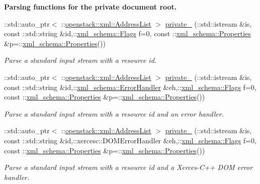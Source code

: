 \begin{Indent}{\bf Parsing functions for the private document root.}
\begin{DoxyCompactItemize}
::std::auto\_\-ptr$<$ ::\hyperlink{classopenstack_1_1xml_1_1AddressList}{openstack::xml::AddressList} $>$ \hyperlink{namespaceopenstack_1_1xml_a8ab362fa648bbf2ce1b9ac6b47ff9483}{private\_\-} (::std::istream \&is, const ::std::string \&id,::\hyperlink{namespacexml__schema_affb4c227cbd9aa7453dd1dc5a1401943}{xml\_\-schema::Flags} f=0, const ::\hyperlink{namespacexml__schema_ad27ce19a7ee1d3b1064092648898f64c}{xml\_\-schema::Properties} \&p=::\hyperlink{namespacexml__schema_ad27ce19a7ee1d3b1064092648898f64c}{xml\_\-schema::Properties}())
\begin{DoxyCompactList}\small\item\em Parse a standard input stream with a resource id. \item\end{DoxyCompactList}\item 
::std::auto\_\-ptr$<$ ::\hyperlink{classopenstack_1_1xml_1_1AddressList}{openstack::xml::AddressList} $>$ \hyperlink{namespaceopenstack_1_1xml_a85b9d818207383587ff0f5cf850a98d6}{private\_\-} (::std::istream \&is, const ::std::string \&id,::\hyperlink{namespacexml__schema_ab1c9361bfd3b404eaabf0c31eded79dc}{xml\_\-schema::ErrorHandler} \&eh,::\hyperlink{namespacexml__schema_affb4c227cbd9aa7453dd1dc5a1401943}{xml\_\-schema::Flags} f=0, const ::\hyperlink{namespacexml__schema_ad27ce19a7ee1d3b1064092648898f64c}{xml\_\-schema::Properties} \&p=::\hyperlink{namespacexml__schema_ad27ce19a7ee1d3b1064092648898f64c}{xml\_\-schema::Properties}())
\begin{DoxyCompactList}\small\item\em Parse a standard input stream with a resource id and an error handler. \item\end{DoxyCompactList}\item 
::std::auto\_\-ptr$<$ ::\hyperlink{classopenstack_1_1xml_1_1AddressList}{openstack::xml::AddressList} $>$ \hyperlink{namespaceopenstack_1_1xml_a9e81ae1c0fca2de181652678edd12629}{private\_\-} (::std::istream \&is, const ::std::string \&id,::xercesc::DOMErrorHandler \&eh,::\hyperlink{namespacexml__schema_affb4c227cbd9aa7453dd1dc5a1401943}{xml\_\-schema::Flags} f=0, const ::\hyperlink{namespacexml__schema_ad27ce19a7ee1d3b1064092648898f64c}{xml\_\-schema::Properties} \&p=::\hyperlink{namespacexml__schema_ad27ce19a7ee1d3b1064092648898f64c}{xml\_\-schema::Properties}())
\begin{DoxyCompactList}\small\item\em Parse a standard input stream with a resource id and a Xerces-\/C++ DOM error handler. \item\end{DoxyCompactList}\item 

\end{DoxyCompactItemize}
\end{Indent}
